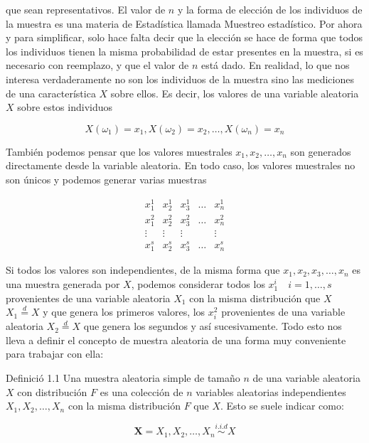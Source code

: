 \documentclass[
]{article}
\begin{document}
que sean representativos. El valor de \(n\) y la forma de elección de los individuos de la muestra es una materia de Estadística llamada Muestreo estadístico. Por ahora y para simplificar, solo hace falta decir que la elección se hace de forma que todos los individuos tienen la misma probabilidad de estar presentes en la muestra, si es necesario con reemplazo, y que el valor de \(n\) está dado.
En realidad, lo que nos interesa verdaderamente no son los individuos de la muestra sino las mediciones de una característica \(X\) sobre ellos. Es decir, los valores de una variable aleatoria \(X\) sobre estos individuos

\[
X\left(\omega_{1}\right)=x_{1}, X\left(\omega_{2}\right)=x_{2}, \ldots, X\left(\omega_{n}\right)=x_{n}
\]

También podemos pensar que los valores muestrales \(x_{1}, x_{2}, \ldots, x_{n}\) son generados directamente desde la variable aleatoria. En todo caso, los valores muestrales no son únicos y podemos generar varias muestras

\[
\begin{array}{ccccc}
x_{1}^{1} & x_{2}^{1} & x_{3}^{1} & \ldots & x_{n}^{1} \\
x_{1}^{2} & x_{2}^{2} & x_{3}^{2} & \ldots & x_{n}^{2} \\
\vdots & \vdots & \vdots & & \vdots \\
x_{1}^{s} & x_{2}^{s} & x_{3}^{s} & \ldots & x_{n}^{s}
\end{array}
\]

Si todos los valores son independientes, de la misma forma que \(x_{1}, x_{2}, x_{3}, \ldots, x_{n}\) es una muestra generada por \(X\), podemos considerar todos los \(x_{1}^{i} \quad i=1, \ldots, s\) provenientes de una variable aleatoria \(X_{1}\) con la misma distribución que \(X\) \(X_{1} \stackrel{d}{=} X\) y que genera los primeros valores, los \(x_{i}^{2}\) provenientes de una variable aleatoria \(X_{2} \stackrel{d}{=} X\) que genera los segundos y así sucesivamente.
Todo esto nos lleva a definir el concepto de muestra aleatoria de una forma muy conveniente para trabajar con ella:

Definició 1.1 Una muestra aleatoria simple de tamaño \(n\) de una variable aleatoria \(X\) con distribución \(F\) es una colección de \(n\) variables aleatorias independientes \(X_{1}, X_{2}, \ldots, X_{n}\) con la misma distribución \(F\) que \(X\). Esto se suele indicar como:

\[
\mathbf{X}=X_{1}, X_{2}, \ldots, X_{n} \stackrel{i . i . d}{\sim} X
\]
\end{document}
